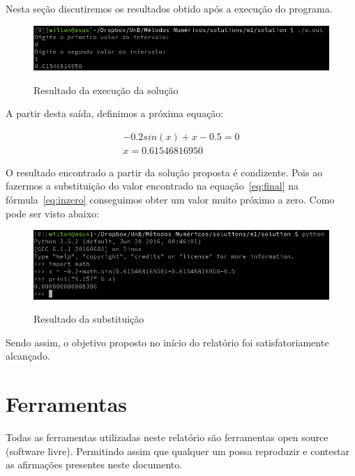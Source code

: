 \documentclass[12pt, hidelinks]{article}
\begin{document}
Nesta seção discutiremos os resultados obtido após a execução do programa.

\begin{figure}[!h]
  \centering
  \includegraphics[width=15cm]{figuras/x.png}\\
  \caption{Resultado da execução da solução}\label{fig:valx}
\end{figure}

A partir desta saída, definimos a próxima equação:

\begin{eqnarray}\label{eq:final}
  -0.2sin(x) + x - 0.5 = 0 \nonumber\\
  x = 0.61546816950
\end{eqnarray}

O resultado encontrado a partir da solução proposta é condizente. Pois ao fazermos a substituição do valor encontrado na equação~\eqref{eq:final} na fórmula~\eqref{eq:inzero} conseguimos obter um valor muito próximo a zero. Como pode ser visto abaixo:

\begin{figure}[!h]
  \centering
  \includegraphics[width=15cm]{figuras/printx.png}\\
  \caption{Resultado da substituição}\label{fig:printx}
\end{figure}

Sendo assim, o objetivo proposto no início do relatório foi satisfatoriamente alcançado.

\newpage
\section{Ferramentas}
Todas as ferramentas utilizadas neste relatório são ferramentas open source (software livre). Permitindo assim que qualquer um possa reproduzir e contestar as afirmações presentes neste documento.
\end{document}
